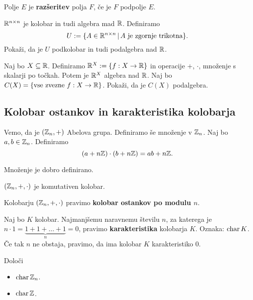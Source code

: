 \begin{definicija}
    Polje $E$ je \textbf{razšeritev} polja $F$, če je $F$ podpolje $E$.
\end{definicija}

\begin{primer}
    $\mathbb{R}^{n \times n}$ je kolobar in tudi algebra mad $\mathbb{R}$. Definiramo $$U := \{A \in \mathbb{R}^{n \times n} \,|\, A \text{ je zgornje trikotna}\}.$$ Pokaži, da je $U$ podkolobar in tudi podalgebra nad $\mathbb{R}$.
\end{primer}

\begin{primer}
    Naj bo $X \subseteq \mathbb{R}$. Definiramo $\mathbb{R}^X := \{f: X \to \mathbb{R}\}$ in operacije $+$, $\cdot$, množenje s skalarji po točkah. Potem je $\mathbb{R}^X$ algebra nad $\mathbb{R}$. Naj bo $C(X) = \{\text{vse zvezne } f: X \to \mathbb{R}\}$. Pokaži, da je $C(X)$ podalgebra.
\end{primer}

\subsection{Kolobar ostankov in karakteristika kolobarja}
Vemo, da je $(\mathbb{Z}_n, +)$ Abelova grupa. Definiramo še množenje v $\mathbb{Z}_n$. Naj bo $a, b \in \mathbb{Z}_n$. Definiramo $$(a+n\mathbb{Z}) \cdot (b + n\mathbb{Z}) = ab + n\mathbb{Z}.$$

\begin{lema}
    Množenje je dobro definirano.
\end{lema}

\begin{trditev}
    $(\mathbb{Z}_n, +, \cdot)$ je komutativen kolobar.
\end{trditev}

\begin{definicija}
    Kolobarju $(\mathbb{Z}_n, +, \cdot)$ pravimo \textbf{kolobar ostankov po modulu $n$}.
\end{definicija}

\begin{definicija}
    Naj bo $K$ kolobar. Najmanjšemu naravnemu številu $n$, za katerega je $n \cdot 1 = \underbrace{1 + 1 + \ldots + 1}_n = 0$, pravimo \textbf{karakteristika} kolobarja $K$. Oznaka: $\operatorname{char} K$. Če tak $n$ ne obstaja, pravimo, da ima kolobar $K$ karakteristiko $0$.
\end{definicija}

\begin{primer}
    Določi
    \begin{itemize}
        \item $\operatorname{char} \mathbb{Z}_n$.
        \item $\operatorname{char} \mathbb{Z}$.
    \end{itemize}
\end{primer}

